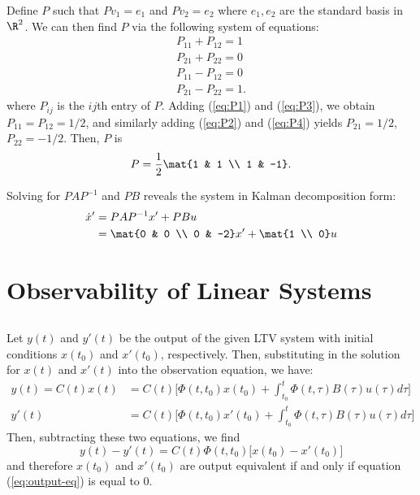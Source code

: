 \documentclass{homework}
\begin{document}
Define $P$ such that $Pv_1 = e_1$ and $Pv_2 = e_2$ where $e_1,e_2$ are
the standard basis in $\R^2$. We can then find $P$ via the following 
system of equations:
\begin{align}
    P_{11} + P_{12} = 1 \label{eq:P1} \\
    P_{21} + P_{22} = 0 \label{eq:P2} \\
    P_{11} - P_{12} = 0 \label{eq:P3} \\
    P_{21} - P_{22} = 1 \label{eq:P4}.
\end{align}
where $P_{ij}$ is the $ij$th entry of $P$.
Adding (\ref{eq:P1}) and (\ref{eq:P3}), we obtain $P_{11} = P_{12} = 1/2$,
and similarly adding (\ref{eq:P2}) and (\ref{eq:P4}) yields
$P_{21} = 1/2$, $P_{22} = -1/2$. Then, $P$ is 
\begin{equation*}
    P = \frac{1}{2} \mat{1 & 1 \\ 1 & -1}.
\end{equation*}

Solving for $PAP^{-1}$ and $PB$ reveals the system in Kalman decomposition form:
\begin{align*}
    \dot{x}' &= PAP^{-1} x' + PBu \\
        &= \mat{0 & 0 \\ 0 & -2} x' + \mat{1 \\ 0}u
\end{align*}

\section{Observability of Linear Systems}
\subsection{}

Let $y(t)$ and $y'(t)$ be the output of the given LTV system with initial
conditions $x(t_0)$ and $x'(t_0)$, respectively. Then, substituting in
the solution for $x(t)$ and $x'(t)$ into the observation equation, we have:
\begin{align*}
    y(t) = C(t)x(t) &= C(t) \biggl[
        \Phi(t, t_0) x(t_0) + \int_{t_0}^{t} \Phi(t, \tau) B(\tau) u(\tau) d\tau
    \biggr] \\
    y'(t) &= C(t) \biggl[
        \Phi(t, t_0) x'(t_0) + \int_{t_0}^{t} \Phi(t, \tau) B(\tau) u(\tau) d\tau
    \biggr]
\end{align*}
Then, subtracting these two equations, we find
\begin{equation}
    y(t) - y'(t) = C(t) \Phi(t, t_0) \biggl[
        x(t_0) - x'(t_0)
    \biggr]
    \label{eq:output-eq}
\end{equation}
and therefore $x(t_0)$ and $x'(t_0)$ are output equivalent if and only if
equation (\ref{eq:output-eq}) is equal to 0. 
\end{document}
